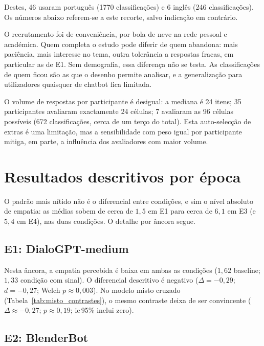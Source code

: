 Destes, 46 usaram português (1770 classificações) e 6 inglês (246 classificações). Os números abaixo referem-se a este recorte, salvo indicação em contrário.

O recrutamento foi de conveniência, por bola de neve na rede pessoal e académica. Quem completa o estudo pode diferir de quem abandona: mais paciência, mais interesse no tema, outra tolerância a respostas fracas, em particular as de E1. Sem demografia, essa diferença não se testa. As classificações de quem ficou são as que o desenho permite analisar, e a generalização para utilizadores quaisquer de chatbot fica limitada.

O volume de respostas por participante é desigual: a mediana é 24 itens; 35 participantes avaliaram exactamente 24 células; 7 avaliaram as 96 células possíveis (672 classificações, cerca de um terço do total). Esta auto-selecção de extras é uma limitação, mas a sensibilidade com peso igual por participante mitiga, em parte, a influência dos avaliadores com maior volume.


\section{Resultados descritivos por época}
\label{sec:res_por_epoca}

O padrão mais nítido não é o diferencial entre condições, e sim o nível absoluto de empatia: as médias sobem de cerca de \(1{,}5\) em E1 para cerca de \(6{,}1\) em E3 (e \(5{,}4\) em E4), nas duas condições. O detalhe por âncora segue.

\subsection{E1: DialoGPT-medium}
\label{subsec:res_e1}

Nesta âncora, a empatia percebida é baixa em ambas as condições (\(1{,}62\) baseline; \(1{,}33\) condição com sinal). O diferencial descritivo é negativo (\(\Delta = -0{,}29\); \(d = -0{,}27\); Welch \(p \approx 0{,}003\)). No modelo misto cruzado (Tabela~\ref{tab:misto_contrastes}), o mesmo contraste deixa de ser convincente (\(\Delta \approx -0{,}27\); \(p \approx 0{,}19\); \gls{ic}\,95\% inclui zero).

\subsection{E2: BlenderBot}
\label{subsec:res_e2}

